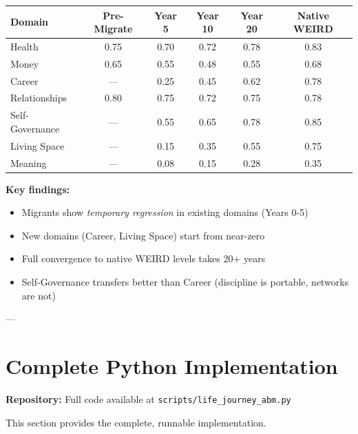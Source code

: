 \begin{center}
\small
\begin{tabular}{@{}lccccc@{}}
\toprule
\textbf{Domain} & \textbf{Pre-Migrate} & \textbf{Year 5} & \textbf{Year 10} & \textbf{Year 20} & \textbf{Native WEIRD} \\
\midrule
Health & 0.75 & 0.70 & 0.72 & 0.78 & 0.83 \\
Money & 0.65 & 0.55 & 0.48 & 0.55 & 0.68 \\
Career & — & 0.25 & 0.45 & 0.62 & 0.78 \\
Relationships & 0.80 & 0.75 & 0.72 & 0.75 & 0.78 \\
Self-Governance & — & 0.55 & 0.65 & 0.78 & 0.85 \\
Living Space & — & 0.15 & 0.35 & 0.55 & 0.75 \\
Meaning & — & 0.08 & 0.15 & 0.28 & 0.35 \\
\bottomrule
\end{tabular}
\end{center}

\textbf{Key findings:}
\begin{itemize}[nosep]
\item Migrants show \textit{temporary regression} in existing domains (Years 0-5)
\item New domains (Career, Living Space) start from near-zero
\item Full convergence to native WEIRD levels takes 20+ years
\item Self-Governance transfers better than Career (discipline is portable, networks are not)
\end{itemize}

---


\section{Complete Python Implementation}
\label{ppp:fullcode}

\begin{tcolorbox}[colback=gray!5!white, colframe=gray!75!black]
\textbf{Repository:} Full code available at \texttt{scripts/life\_journey\_abm.py}

This section provides the complete, runnable implementation.
\end{tcolorbox}

